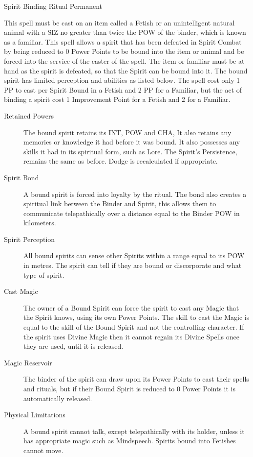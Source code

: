 \begin{rpg-spell}
{Spirit Binding Ritual}
{Permanent}

This spell must be cast on an item called a Fetish or an unintelligent natural animal with a SIZ no greater than twice the POW of the binder, which is known as a familiar. This spell allows a spirit that has been defeated in Spirit Combat by being reduced to 0 Power Points to be bound into the item or animal and be forced into the service of the caster of the spell. The item or familiar must be at hand as the spirit is defeated, so that the Spirit can be bound into it. The bound spirit has limited perception and abilities as listed below. The spell cost only 1 PP to cast per Spirit Bound in a Fetish and 2 PP for a Familiar, but the act of binding a spirit cost 1 Improvement Point for a Fetish and 2 for a Familiar.
\begin{description}
\item[Retained Powers] The bound spirit retains its INT, POW and CHA, It also retains any memories or knowledge it had before it was bound. It also possesses any skills it had in its spiritual form, such as Lore. The Spirit’s Persistence, remains the same as before. Dodge is recalculated if appropriate.
\item[Spirit Bond] A bound spirit is forced into loyalty by the ritual. The bond also creates a spiritual link between the Binder and Spirit, this allows them to communicate telepathically over a distance equal to the Binder POW in kilometers.
\item[Spirit Perception] All bound spirits can sense other Spirits within a range equal to its POW in metres. The spirit can tell if they are bound or discorporate and what type of spirit.
\item[Cast Magic] The owner of a Bound Spirit can force the spirit to cast any Magic that the Spirit knows, using its own Power Points. The skill to cast the Magic is equal to the skill of the Bound Spirit and not the controlling character. If the spirit uses Divine Magic then it cannot regain its Divine Spells once they are used, until it is released.
\item[Magic Reservoir] The binder of the spirit can draw upon its Power Points to cast their spells and rituals, but if their Bound Spirit is reduced to 0 Power Points it is automatically released.
\item[Physical Limitations] A bound spirit cannot talk, except telepathically with its holder, unless it has appropriate magic such as Mindspeech. Spirits bound into Fetishes cannot move.

\end{description}
\end{rpg-spell}
